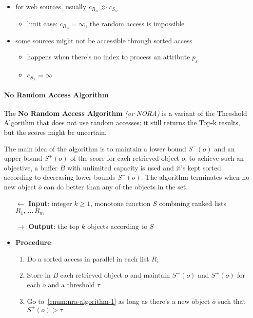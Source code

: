 \documentclass[english]{article}
\begin{document}
\begin{itemize}
  \item for web sources, usually \(c_{R_A} \gg c_{S_R}\)
        \begin{itemize}
          \item limit case: \(c_{R_A} = \infty\), the random access is impossible
        \end{itemize}
  \item some sources might not be accessible through sorted access
        \begin{itemize}
          \item happens when there's no index to process an attribute \(p_j\)
          \item \(c_{S_A} = \infty\)
        \end{itemize}
\end{itemize}

\paragraph{No Random Access Algorithm}
The \textbf{No Random Access Algorithm} \textit{(or NORA)} is a variant of the Threshold Algorithm that does not use random accesses;
it still returns the Top-k results, but the scores might be uncertain.

The main idea of the algorithm is to maintain a lower bound \(S^-(o)\) and an upper bound \(S^+(o)\) of the score for each retrieved object \(o\);
to achieve such an objective, a buffer \(B\) with unlimited capacity is used and it's kept sorted according to decreasing lower bounds \(S^-(o)\).
The algorithm terminates when no new object \(\overline{o}\) can do better than any of the objects in the set.

\begin{itemize}
  \item[\(\leftarrow\)] \textbf{Input}: integer \(k \geq 1\), monotone function \(S\) combining ranked lists \(R_1, \,\ldots\, R_m\)
  \item[\(\rightarrow\)] \textbf{Output}: the top \(k\) objects according to \(S\)
  \item \textbf{Procedure}:
        \begin{enumerate}[label=step \arabic*., ref=step (\arabic*), widest*=7, leftmargin=*, labelindent=1em]
          \item\label{enum:nra-algorithm-1} Do a sorted access in parallel in each list \(R_i\)
          \item Store in \(B\) each retrieved object \(o\) and maintain \(S^-(o)\) and \(S^+(o)\) for each \(o\) and a threshold \(\tau\)
          \item Go to~\ref{enum:nra-algorithm-1} as long as there's a new object \(\overline{o}\) such that \(S^+(o) > \tau\)
        \end{enumerate}
\end{itemize}
\end{document}
